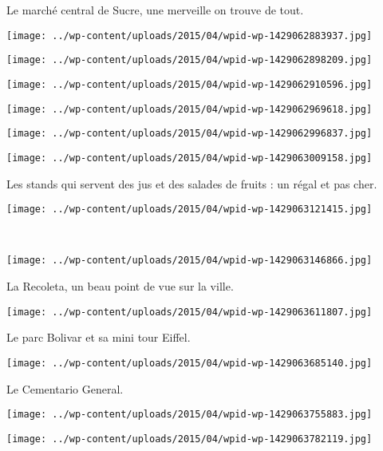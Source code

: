  Le marché central de Sucre, une merveille on trouve de tout. 
\begin{center} \texttt{[image: ../wp-content/uploads/2015/04/wpid-wp-1429062883937.jpg]} \end{center}
\begin{center} \texttt{[image: ../wp-content/uploads/2015/04/wpid-wp-1429062898209.jpg]} \end{center}
\begin{center} \texttt{[image: ../wp-content/uploads/2015/04/wpid-wp-1429062910596.jpg]} \end{center}
\begin{center} \texttt{[image: ../wp-content/uploads/2015/04/wpid-wp-1429062969618.jpg]} \end{center}
\begin{center} \texttt{[image: ../wp-content/uploads/2015/04/wpid-wp-1429062996837.jpg]} \end{center}
\begin{center} \texttt{[image: ../wp-content/uploads/2015/04/wpid-wp-1429063009158.jpg]} \end{center}

  Les stands qui servent des jus et des salades de fruits : un régal et pas cher. 
\begin{center} \texttt{[image: ../wp-content/uploads/2015/04/wpid-wp-1429063121415.jpg]} \end{center}
\vspace{-\topsep}

\pagebreak
~
\begin{center} \texttt{[image: ../wp-content/uploads/2015/04/wpid-wp-1429063146866.jpg]} \end{center}

 La Recoleta, un beau point de vue sur la ville.
\begin{center} \texttt{[image: ../wp-content/uploads/2015/04/wpid-wp-1429063611807.jpg]} \end{center}
\vspace{-\topsep}

\pagebreak
 Le parc Bolivar et sa mini tour Eiffel.
\begin{center} \texttt{[image: ../wp-content/uploads/2015/04/wpid-wp-1429063685140.jpg]} \end{center}

 Le Cementario General.
\begin{center} \texttt{[image: ../wp-content/uploads/2015/04/wpid-wp-1429063755883.jpg]} \end{center}
\begin{center} \texttt{[image: ../wp-content/uploads/2015/04/wpid-wp-1429063782119.jpg]} \end{center}

